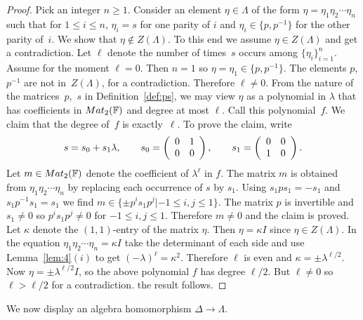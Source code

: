\documentclass[10pt,a4paper]{amsart}
\numberwithin{equation}{section}
\begin{document}
\begin{proof}
Pick an integer $n\geq 1$.
Consider an element $\eta \in \Lambda $
of the form
$\eta =\eta_1 \eta_2 \cdots \eta_n$ such that
 for $1 \leq i \leq n$,  $\eta_i=s$
for one parity of $i$ and
$\eta_i \in \lbrace p,p^{-1} \rbrace$ for the other parity of~$i$.
We show that $\eta \not\in Z(\Lambda)$.
To this end we assume
 $\eta \in Z(\Lambda )$ and get a contradiction.
Let $\ell$ denote the number of times~$s$ occurs among
$\lbrace \eta_i\rbrace_{i=1}^n$.
Assume for the moment $\ell = 0$.
Then $n=1$ so
$\eta =\eta_1 \in \lbrace p, p^{-1}\rbrace$.
The elements $p$, $p^{-1}$ are not in~$Z(\Lambda)$, for a contradiction.
Therefore $\ell \neq 0$.
From the nature of the matrices~$p$,~$s$ in Def\/inition~\ref{def:ps},
we may
view $\eta $ as a polynomial in $\lambda$
that has
coef\/f\/icients in
${\rm {Mat}}_2(\mathbb F)$ and degree at most $\ell$.
Call this polynomial~$f$.
We claim that the degree of~$f$ is exactly~$\ell$.
To prove the claim,
write
\begin{gather*}
s = s_0+ s_1 \lambda,   \qquad
s_0= \left(
\begin{array}{  c c}
0 & 1  \\
0 & 0
\end{array}
\right),
\qquad
s_1= \left(
\begin{array}{  c c}
0 & 0  \\
1 & 0
\end{array}
\right).
\end{gather*}
Let $m
\in {\rm {Mat}}_2(\mathbb F)$ denote the coef\/f\/icient of
$\lambda^\ell$ in $f$.
The matrix $m$ is obtained from
$\eta_1 \eta_2\cdots \eta_n$ by
replacing each occurrence of $s$ by $s_1$.
Using $s_1p s_1=-s_1$ and
 $s_1p^{-1} s_1=s_1$  we f\/ind
$m\in \lbrace \pm p^i s_1 p^j |
-1 \leq i,j\leq 1\rbrace $. The matrix $p$ is invertible
and $s_1\not=0$ so
$p^i s_1 p^j\not=0$ for $-1 \leq i,j \leq 1$.
Therefore $m\not=0$ and the claim is proved.
Let $\kappa $ denote the $(1,1)$-entry of the matrix $\eta $.
Then $\eta=\kappa I$ since $\eta \in Z(\Lambda )$.
In the equation
$\eta_1 \eta_2\cdots \eta_n=\kappa I$ take the determinant of
each side and use
Lemma~\ref{lem:4}$(i)$
to get $(-\lambda)^\ell = \kappa^2$.
Therefore $\ell $ is even and
$\kappa=\pm \lambda^{\ell/2}$.
Now $\eta =\pm \lambda^{\ell/2} I$, so
the above polynomial $f$ has degree $\ell/2$.
But $\ell \not=0$ so $\ell > \ell/2$
for a contradiction.
the result follows.
\end{proof}

We now display an algebra homomorphism $\Delta \to \Lambda $.
\end{document}
